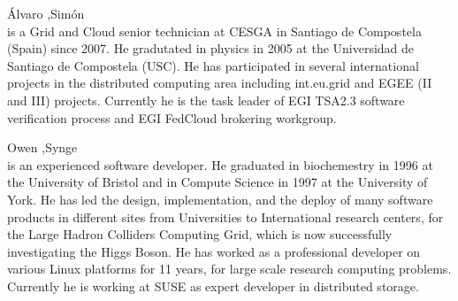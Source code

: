 \documentclass{cai}
\begin{document}
\bio{}\'Alvaro ,Sim\'on\\ is a Grid and Cloud senior technician at CESGA in Santiago de Compostela (Spain) since 2007. He gradutated in physics in 2005 at the Universidad de Santiago de Compostela (USC). He has participated in several international projects in the distributed computing area including int.eu.grid and EGEE (II and III) projects. Currently he is the task leader of EGI TSA2.3 software verification process and EGI FedCloud brokering workgroup.


\bio{}Owen ,Synge\\ is an experienced software developer. He graduated in biochemestry in 1996 at the University of Bristol and in Compute Science in 1997 at the University of York. He has led the design, implementation, and the deploy of many software products in different sites from Universities to International research centers, for the Large Hadron Colliders Computing Grid, which is now successfully investigating the Higgs Boson. 
He has worked as a professional developer on various Linux platforms for 11 years, for large scale research computing problems. Currently he is working at SUSE as expert developer in distributed storage.


\label{lastpage}
\end{document}
